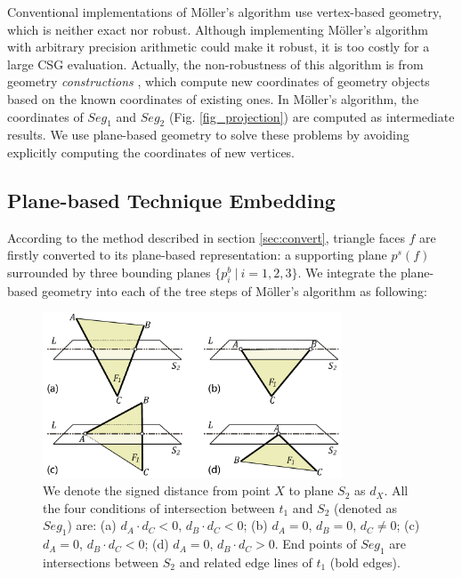 \documentclass[10pt,journal,compsoc]{IEEEtran}
\begin{document}
Conventional implementations of M\"{o}ller's algorithm use vertex-based geometry, which is neither exact nor robust.  Although implementing M\"{o}ller's algorithm with arbitrary precision arithmetic could make it robust, it is too costly for a large CSG evaluation. Actually, the non-robustness of this algorithm is from geometry \emph{constructions} \cite{bernstein2009fast}, which compute new coordinates of geometry objects based on the known coordinates of existing ones. In M\"{o}ller's algorithm, the coordinates of $Seg_1$ and $Seg_2$ (Fig. \ref{fig_projection}) are computed as intermediate results. We use plane-based geometry to solve these problems by avoiding explicitly computing the coordinates of new vertices.


\subsection{Plane-based Technique Embedding}

\label{sec:embed}
According to the method described in section \ref{sec:convert}, triangle faces $f$ are firstly converted to its plane-based representation: a supporting plane $p^s(f)$ surrounded by three bounding planes $\{p^b_i\ |\  i = 1,2,3\}$. We integrate the plane-based geometry into each of the tree steps of M\"{o}ller's algorithm as following:

\begin{figure}[t]
\centering
\includegraphics[width=3.5in]{sign}
\caption{We denote the signed distance from point $X$ to plane $S_2$ as $d_X$. All the four conditions of intersection between $t_1$ and $S_2$ (denoted as $Seg_1$) are:  (a) $d_A\cdot d_C<0$, $d_B\cdot d_C<0$; (b) $d_A=0$, $d_B=0$, $d_C\neq 0$; (c) $d_A=0$, $d_B\cdot d_C<0$; (d) $d_A=0$, $d_B\cdot d_C>0$. End points of $Seg_1$ are intersections between $S_2$ and related edge lines of $t_1$ (bold edges).}
\label{fig:isect}
\end{figure}
\end{document}
